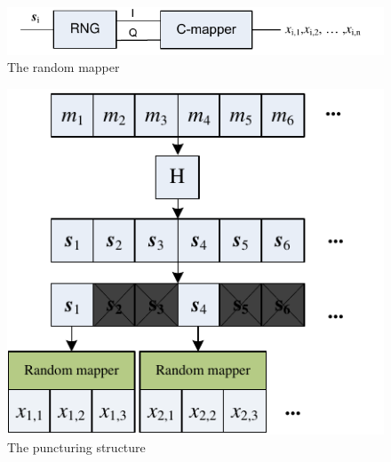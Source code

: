 \documentclass[conference]{IEEEtran}
\begin{document}
%
%
\begin{figure}[ht]
\centering
\includegraphics[width=0.9\columnwidth]{mapper.pdf}
\caption{The random mapper}
\label{fig_mapper}
\end{figure}
\begin{figure}[ht]
\centering
\includegraphics[width=3 in]{punturing.pdf}
\caption{The puncturing structure}
\label{fig_puncturing}
\end{figure}
\end{document}
